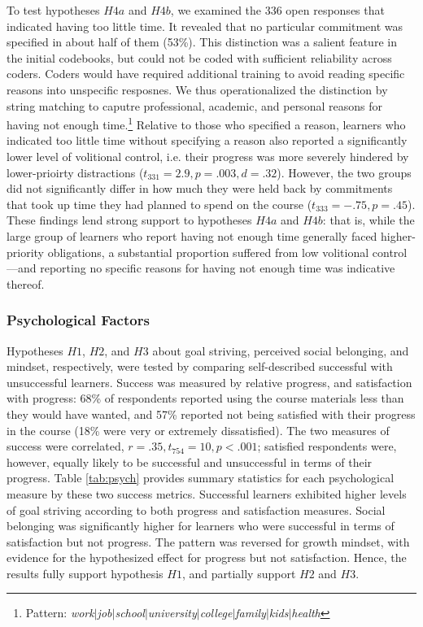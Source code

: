 \documentclass{sigchi}\usepackage[]{graphicx}\usepackage[]{color}
\begin{document}
To test hypotheses $H4a$ and $H4b$, we examined the 336 open responses that indicated having too little time. It revealed that no particular commitment was specified in about half of them (53\%). This distinction was a salient feature in the initial codebooks, but could not be coded with sufficient reliability across coders. Coders would have required additional training to avoid reading specific reasons into unspecific resposnes. We thus operationalized the distinction by string matching to caputre professional, academic, and personal reasons for having not enough time.\footnote{Pattern: {\em work$|$job$|$school$|$university$|$college$|$family$|$kids$|$health}} Relative to those who specified a reason, learners who indicated too little time without specifying a reason also reported a significantly lower level of volitional control, i.e. their progress was more severely hindered by lower-prioirty distractions ($t_{331}=2.9, p=.003, d=.32$). However, the two groups did not significantly differ in how much they were held back by commitments that took up time they had planned to spend on the course ($t_{333}=-.75, p=.45$). These findings lend strong support to hypotheses $H4a$ and $H4b$: that is, while the large group of learners who report having not enough time generally faced higher-priority obligations, a substantial proportion suffered from low volitional control---and reporting no specific reasons for having not enough time was indicative thereof.

\subsubsection{Psychological Factors}

Hypotheses $H1$, $H2$, and $H3$ about goal striving, perceived social belonging, and mindset, respectively, were tested by comparing self-described successful with unsuccessful learners. Success was measured by relative progress, and satisfaction with progress: 68\% of respondents reported using the course materials less than they would have wanted, and 57\% reported not being satisfied with their progress in the course (18\% were very or extremely dissatisfied). The two measures of success were correlated, $r=.35, t_{754}=10, p<.001$; satisfied respondents were, however, equally likely to be successful and unsuccessful in terms of their progress. Table \ref{tab:psych} provides summary statistics for each psychological measure by these two success metrics. Successful learners exhibited higher levels of goal striving according to both progress and satisfaction measures. Social belonging was significantly higher for learners who were successful in terms of satisfaction but not progress. The pattern was reversed for growth mindset, with evidence for the hypothesized effect for progress but not satisfaction. Hence, the results fully support hypothesis $H1$, and partially support $H2$ and $H3$.
\end{document}

